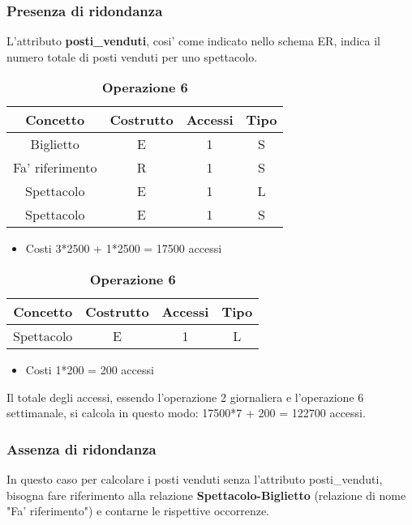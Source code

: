 \documentclass[10pt]{article}
\begin{document}
	\subsubsection{Presenza di ridondanza}
	L'attributo \textbf{posti\_venduti}, cosi' come indicato nello schema ER, indica il numero totale di posti venduti per uno spettacolo.
	
	\begin{table}[h!]
		\centering
		\caption{\textbf{Operazione 2}} \label{tab:sometab}
		\begin{tabular}{|c|c|c|c|}
			\hline
			\textbf{Concetto} & \textbf{Costrutto} & \textbf{Accessi} & \textbf{Tipo} \\
			\hline
			Biglietto & E & 1 & S \\
			\hline
			Fa' riferimento & R & 1 & S \\
			\hline
			Spettacolo & E & 1 & L \\
			\hline
			Spettacolo & E & 1 & S \\
			\hline
		\end{tabular}
		\begin{itemize}
			\item Costi 3*2500 + 1*2500 = 17500 accessi 
		\end{itemize}
		\caption{\textbf{Operazione 6}} \label{tab:sometab}
		\begin{tabular}{|c|c|c|c|}
			\hline
			\textbf{Concetto} & \textbf{Costrutto} & \textbf{Accessi} & \textbf{Tipo} \\
			\hline
			Spettacolo & E & 1 & L \\
			\hline
		\end{tabular}
		\begin{itemize}
		\item Costi 1*200 = 200 accessi 
		\end{itemize}
	\end{table}
	Il totale degli accessi, essendo l'operazione 2 giornaliera e l'operazione 6 settimanale, si calcola in questo modo: 17500*7 + 200 = 122700 accessi.
	\subsubsection{Assenza di ridondanza}
	In questo caso per calcolare i posti venduti senza l'attributo posti\_venduti, bisogna fare riferimento alla relazione \textbf{Spettacolo-Biglietto} (relazione di nome "Fa' riferimento") e contarne le rispettive occorrenze.
	
\end{document}
